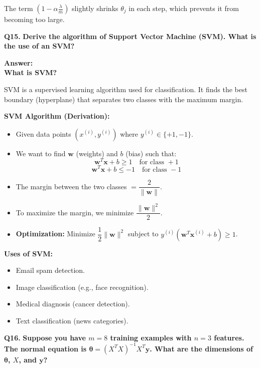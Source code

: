 \documentclass[12pt,a4paper]{article}
\newcommand{\question}[2]{%
    \begin{mdframed}[style=questionstyle]
        \textbf{\textcolor{headerblue}{Q#1.}} \textbf{#2}
    \end{mdframed}%
    \vspace{2pt}%
}
\newcommand{\ans}{\textbf{\textcolor{headerblue}{Answer:}}\\[4pt]}
\newcommand{\subhead}[1]{\textbf{\textcolor{headerblue}{#1}}}
\begin{document}
The term $\left(1 - \alpha\frac{\lambda}{m}\right)$ slightly shrinks $\theta_j$ in each step, which prevents it from becoming too large.

\vspace{10pt}
\question{15}{Derive the algorithm of Support Vector Machine (SVM). What is the use of an SVM?}

\ans

\subhead{What is SVM?}

SVM is a supervised learning algorithm used for classification. It finds the best boundary (hyperplane) that separates two classes with the maximum margin.

\subhead{SVM Algorithm (Derivation):}
\begin{itemize}[leftmargin=*]
    \item Given data points $(x^{(i)}, y^{(i)})$ where $y^{(i)} \in \{+1, -1\}$.
    \item We want to find $\mathbf{w}$ (weights) and $b$ (bias) such that:
    \[
    \mathbf{w}^T \mathbf{x} + b \geq 1 \quad \text{for class } +1
    \]
    \[
    \mathbf{w}^T \mathbf{x} + b \leq -1 \quad \text{for class } -1
    \]
    \item The margin between the two classes $= \dfrac{2}{\|\mathbf{w}\|}$.
    \item To maximize the margin, we minimize $\dfrac{\|\mathbf{w}\|^2}{2}$.
    \item \textbf{Optimization:} Minimize $\dfrac{1}{2}\|\mathbf{w}\|^2$ subject to $y^{(i)}\left(\mathbf{w}^T \mathbf{x}^{(i)} + b\right) \geq 1$.
\end{itemize}

\subhead{Uses of SVM:}
\begin{itemize}[leftmargin=*]
    \item Email spam detection.
    \item Image classification (e.g., face recognition).
    \item Medical diagnosis (cancer detection).
    \item Text classification (news categories).
\end{itemize}

\vspace{10pt}
\question{16}{Suppose you have $m=8$ training examples with $n=3$ features. The normal equation is $\boldsymbol{\theta} = (X^T X)^{-1} X^T \mathbf{y}$. What are the dimensions of $\boldsymbol{\theta}$, $X$, and $\mathbf{y}$?}
\end{document}
